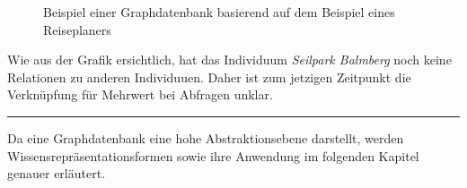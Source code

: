 \begin{figure}[H]
\centering {}
\caption{Beispiel einer Graphdatenbank basierend auf dem Beispiel eines Reiseplaners\label{fig:protegebeispiel}\protect\footnotemark}
\end{figure}

Wie aus der Grafik ersichtlich, hat das Individuum \textit{Seilpark Balmberg} noch keine Relationen zu anderen Individuuen. Daher ist zum jetzigen Zeitpunkt die Verknüpfung für Mehrwert bei Abfragen unklar.

\vspace{0.1pt}
\noindent\rule[1ex]{\textwidth}{1pt}

Da eine Graphdatenbank eine hohe Abstraktionsebene darstellt, werden Wissensrepräsentationsformen sowie ihre Anwendung im folgenden Kapitel genauer erläutert.
